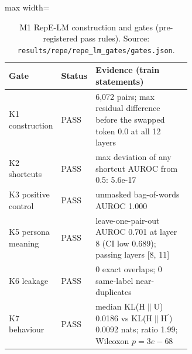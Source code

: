 \begin{table}[t]
\centering
\small
\caption{M1 RepE-LM construction and gates (pre-registered pass rules). Source: \texttt{results/\allowbreak{}repe/\allowbreak{}repe\_lm\_gates/\allowbreak{}gates.json}.}
\label{tab:m1}
\begin{adjustbox}{max width=\linewidth}
\begin{tabular}{llp{0.62\linewidth}}
\toprule
Gate & Status & Evidence (train statements) \\
\midrule
K1 construction & PASS & 6,072 pairs; max residual difference before the swapped token 0.0 at all 12 layers \\
K2 shortcuts & PASS & max deviation of any shortcut AUROC from 0.5: 5.6e-17 \\
K3 positive control & PASS & unmasked bag-of-words AUROC 1.000 \\
K5 persona meaning & PASS & leave-one-pair-out AUROC 0.701 at layer 8 (CI low 0.689); passing layers [8, 11] \\
K6 leakage & PASS & 0 exact overlaps; 0 same-label near-duplicates \\
K7 behaviour & PASS & median KL(H$\|$U) 0.0186 vs KL(H$\|$H$^\prime$) 0.0092 nats; ratio 1.99; Wilcoxon $p=3e-68$ \\
\bottomrule
\end{tabular}
\end{adjustbox}
\end{table}

